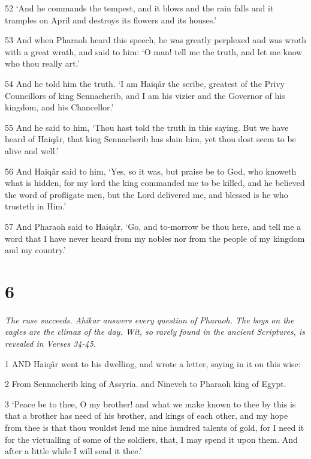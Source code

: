 \par 52 ‘And he commands the tempest, and it blows and the rain falls and it tramples on April and destroys its flowers and its houses.’

\par 53 And when Pharaoh heard this speech, he was greatly perplexed and was wroth with a great wrath, and said to him: ‘O man! tell me the truth, and let me know who thou really art.’

\par 54 And he told him the truth. ‘I am Haiqâr the scribe, greatest of the Privy Councillors of king Sennacherib, and I am his vizier and the Governor of his kingdom, and his Chancellor.’

\par 55 And he said to him, ‘Thou hast told the truth in this saying. But we have heard of Haiqâr, that king Sennacherib has slain him, yet thou dost seem to be alive and well.’

\par 56 And Haiqâr said to him, ‘Yes, so it was, but praise be to God, who knoweth what is hidden, for my lord the king commanded me to be killed, and he believed the word of profligate men, but the Lord delivered me, and blessed is he who trusteth in Him.’

\par 57 And Pharaoh said to Haiqâr, ‘Go, and to-morrow be thou here, and tell me a word that I have never heard from my nobles nor from the people of my kingdom and my country.’

\chapter{6}

\par \textit{The ruse succeeds. Ahikar answers every question of Pharaoh. The boys on the eagles are the climax of the day. Wit, so rarely found in the ancient Scriptures, is revealed in Verses 34-45.}

\par 1 AND Haiqâr went to his dwelling, and wrote a letter, saying in it on this wise:

\par 2 From Sennacherib king of Assyria. and Nineveh to Pharaoh king of Egypt.

\par 3 ‘Peace be to thee, O my brother! and what we make known to thee by this is that a brother has need of his brother, and kings of each other, and my hope from thee is that thou wouldst lend me nine hundred talents of gold, for I need it for the victualling of some of the soldiers, that, I may spend it upon them. And after a little while I will send it thee.’

